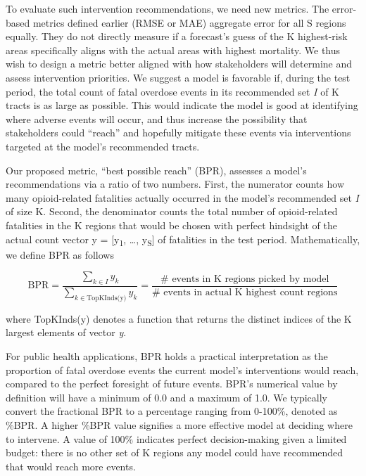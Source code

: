 To evaluate such intervention recommendations, we need new metrics. The error-based metrics defined earlier (RMSE or MAE) aggregate error for all S regions equally. They do not directly measure if a forecast's guess of the K highest-risk areas specifically aligns with the actual areas with highest mortality. We thus wish to design a metric better aligned with how stakeholders will determine and assess intervention priorities. We suggest a model is favorable if, during the test period, the total count of fatal overdose events in its recommended set \emph{I} of K tracts is as large as possible. This would indicate the model is good at identifying where adverse events will occur, and thus increase the possibility that stakeholders could ``reach'' and hopefully mitigate these events via interventions targeted at the model's recommended tracts.

Our proposed metric, ``best possible reach'' (BPR), assesses a model's recommendations via a ratio of two numbers. First, the numerator counts how many opioid-related fatalities actually occurred in the model's recommended set \emph{I} of size K. Second, the denominator counts the total number of opioid-related fatalities in the K regions that would be chosen with perfect hindsight of the actual count vector y = {[}y\textsubscript{1}, \ldots, y\textsubscript{S}{]} of fatalities in the test period. Mathematically, we define BPR as follows

\begin{equation}
    \text{BPR} = \frac{\sum_{k \in I}^{}y_{k}}{\sum_{k \in \text{TopKInds(y)}}y_{k}} = \frac{\text{$\#$ events in K regions picked by model}}{\text{$\#$ events in actual K highest count regions}}
\end{equation}

where TopKInds(y) denotes a function that returns the distinct indices of the K largest elements of vector \emph{y}.

For public health applications, BPR holds a practical interpretation as the proportion of fatal overdose events the current model's interventions would reach, compared to the perfect foresight of future events. BPR's numerical value by definition will have a minimum of 0.0 and a maximum of 1.0. We typically convert the fractional BPR to a percentage ranging from 0-100\%, denoted as \%BPR. A higher \%BPR value signifies a more effective model at deciding where to intervene. A value of 100\% indicates perfect decision-making given a limited budget: there is no other set of K regions any model could have recommended that would reach more events.

